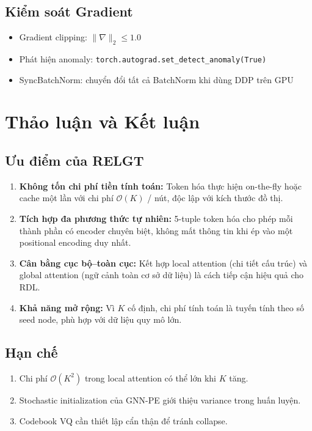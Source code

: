 \documentclass[12pt,a4paper]{article}
\begin{document}
\subsection{Kiểm soát Gradient}

\begin{itemize}
  \item Gradient clipping: $\|\nabla\|_2 \le 1.0$
  \item Phát hiện anomaly: \texttt{torch.autograd.set\_detect\_anomaly(True)}
  \item SyncBatchNorm: chuyển đổi tất cả BatchNorm khi dùng DDP trên GPU
\end{itemize}

\section{Thảo luận và Kết luận}

\subsection{Ưu điểm của RELGT}

\begin{enumerate}
  \item \textbf{Không tốn chi phí tiền tính toán:} Token hóa thực hiện on-the-fly
        hoặc cache một lần với chi phí $\mathcal{O}(K)$ / nút, độc lập với 
        kích thước đồ thị.
  \item \textbf{Tích hợp đa phương thức tự nhiên:} 5-tuple token hóa cho phép
        mỗi thành phần có encoder chuyên biệt, không mất thông tin khi ép vào
        một positional encoding duy nhất.
  \item \textbf{Cân bằng cục bộ--toàn cục:} Kết hợp local attention (chi tiết cấu trúc)
        và global attention (ngữ cảnh toàn cơ sở dữ liệu) là cách tiếp cận
        hiệu quả cho RDL.
  \item \textbf{Khả năng mở rộng:} Vì $K$ cố định, chi phí tính toán là tuyến tính
        theo số seed node, phù hợp với dữ liệu quy mô lớn.
\end{enumerate}

\subsection{Hạn chế}

\begin{enumerate}
  \item Chi phí $\mathcal{O}(K^2)$ trong local attention có thể lớn khi $K$ tăng.
  \item Stochastic initialization của GNN-PE giới thiệu variance trong huấn luyện.
  \item Codebook VQ cần thiết lập cẩn thận để tránh collapse.
\end{enumerate}
\end{document}
